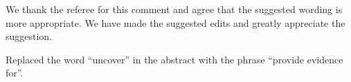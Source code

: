 We thank the referee for this comment and agree that the suggested wording is more appropriate.
We have made the suggested edits and greatly appreciate the suggestion.

\begin{changesmade}
Replaced the word ``uncover'' in the abstract with the phrase ``provide evidence for''.
\end{changesmade}
